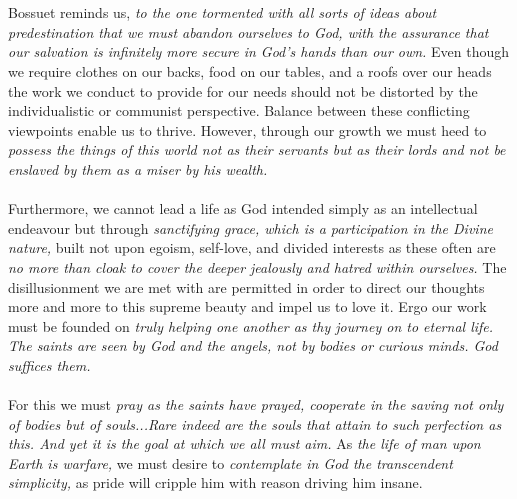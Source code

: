 \documentclass[11pt, sigconf, nonacm]{acmart}
\begin{document}
\ \\
\ \\
Bossuet reminds us, \textit{to the one tormented with all sorts of ideas about predestination that we must abandon ourselves to God, with the assurance that our salvation is infinitely more secure in God's hands than our own.} Even though we require clothes on our backs, food on our tables, and a roofs over our heads the work we conduct to provide for our needs should not be distorted by the individualistic or communist perspective. Balance between these conflicting viewpoints enable us to thrive. However, through our growth we must heed to \textit{possess the things of this world not as their servants but as their lords and not be enslaved by them as a miser by his wealth.} 
\ \\
\ \\
Furthermore, we cannot lead a life as God intended simply as an intellectual endeavour but through \textit{sanctifying grace, which is a participation in the Divine nature,} built not upon egoism, self-love, and divided interests as these often are \textit{no more than cloak to cover the deeper jealously and hatred within ourselves.} The disillusionment we are met with are permitted in order to direct our thoughts more and more to this supreme beauty and impel us to love it. Ergo our work must be founded on \textit{truly helping one another as thy journey on to eternal life.} \textit{The saints are seen by God and the angels, not by bodies or curious minds. God suffices them.} 
\ \\
\ \\
For this we must \textit{pray as the saints have prayed, cooperate in the saving not only of bodies but of souls...Rare indeed are the souls that attain to such perfection as this. And yet it is the goal at which we all must aim.} As \textit{the life of man upon Earth is warfare,} we must desire to \textit{contemplate in God the transcendent simplicity,} as pride will cripple him with reason driving him insane. 
\end{document}
